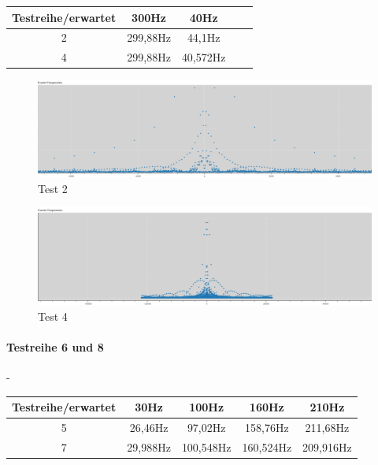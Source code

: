\begin{table}[h!]
	\centering
	\begin{tabular}{|c | c | c | c | c |}		
		\hline
		Testreihe/erwartet & 300Hz & 40Hz \\
		\hline\hline
		2		&	299,88Hz & 44,1Hz \\
		4		&	299,88Hz & 40,572Hz	\\
		\hline	
	\end{tabular}	
\end{table}

\begin{figure}[h!]
	\centering      
	\includegraphics[scale=0.34]{results/test2.png}
	\caption{Test 2}
	\label{fig:test2}
\end{figure}

\begin{figure}[h!]
	\centering      
	\includegraphics[scale=0.34]{results/test4.png}
	\caption{Test 4}
	\label{fig:test4}
\end{figure}

\newpage

\paragraph{Testreihe 6 und 8}
-

\begin{table}[h!]
	\centering
	\begin{tabular}{|c | c | c | c | c |}		
		\hline
		Testreihe/erwartet & 30Hz & 100Hz & 160Hz & 210Hz\\
		\hline\hline
		5		&	26,46Hz & 97,02Hz & 158,76Hz & 211,68Hz \\
		7		&	29,988Hz & 100,548Hz & 160,524Hz & 209,916Hz \\
		\hline	
	\end{tabular}	
\end{table}


